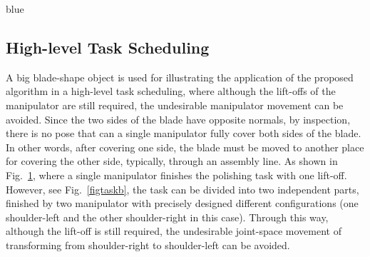 \documentclass[journal]{IEEEtran}
\begin{document}
\begin{color}{blue}
\subsection{High-level Task Scheduling}\label{subsectiontask}
A big blade-shape object is used for illustrating the application of the proposed algorithm in a high-level task scheduling, where although the lift-offs of the manipulator are still required, the undesirable manipulator movement can be avoided. Since the two sides of the blade have opposite normals, by inspection, there is no pose that can a single manipulator fully cover both sides of the blade. In other words, after covering one side, the blade must be moved to another place for covering the other side, typically, through an assembly line. 
As shown in Fig.~\ref{figtaska}, where a single manipulator finishes the polishing task with one lift-off. 
However, see Fig.~\ref{figtaskb}, the task can be divided into two independent parts, finished by two manipulator with precisely designed different configurations (one shoulder-left and the other shoulder-right in this case). 
Through this way, although the lift-off is still required, the undesirable joint-space movement of transforming from shoulder-right to shoulder-left can be avoided. 
\begin{figure}[t]
\centering
\label{figtaska}

\end{figure}
\end{color}
\end{document}
